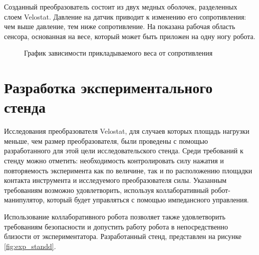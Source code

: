Созданный преобразователь состоит из двух медных оболочек, разделенных слоем Velostat. Давление на датчик приводит к изменению его сопротивления: чем выше давление, тем ниже сопротивление. На  показана рабочая область сенсора, основанная на весе, который может быть приложен на одну ногу робота.
\begin{figure}[h]
    \centering
    \caption{График зависимости прикладываемого веса от сопротивления}
    \label{fig:velostat_pressure_resistance.jpg}
\end{figure}

\section{Разработка экспериментального стенда}

Исследования преобразователя Velostat, для случаев которых площадь нагрузки меньше, чем размер преобразователя, были проведены с помощью разработанного для этой цели исследовательского стенда. Среди требований к стенду можно отметить: необходимость контролировать силу нажатия и повторяемость эксперимента как по величине, так и по расположению площадки контакта инструмента и исследуемого преобразователя силы. Указанным требованиям возможно удовлетворить, используя коллаборативный робот-манипулятор, который будет управляться с помощью импедансного управления.

Использование коллаборативного робота позволяет также удовлетворить требованиям безопасности и допустить работу робота в непосредственно близости от экспериментатора. Разработанный стенд, представлен на рисунке \ref{fig:exp_standd}.

